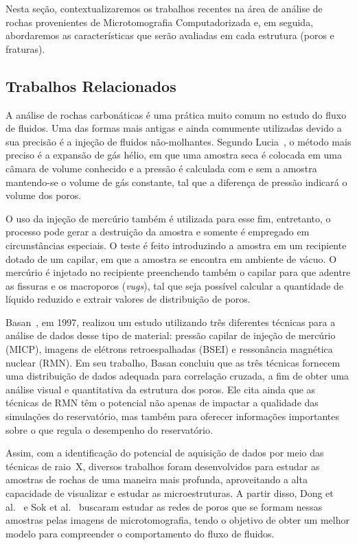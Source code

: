 \documentclass[a4paper,10pt,twocolumn,twoside]{article}
\begin{document}
Nesta seção, contextualizaremos os trabalhos recentes na área de análise de rochas provenientes de Microtomografia Computadorizada e, em seguida, abordaremos as características que serão avaliadas em cada estrutura (poros e fraturas). 

\subsection{Trabalhos Relacionados}


A análise de rochas carbonáticas é uma prática muito comum no estudo do fluxo de fluidos. Uma das formas mais antigas e ainda comumente utilizadas devido a sua precisão é a injeção de fluidos não-molhantes. Segundo Lucia~\cite{lucia2007carbonate}, o método mais preciso é a expansão de gás hélio, em que uma amostra seca é colocada em uma câmara de volume conhecido e a pressão é calculada com e sem a amostra mantendo-se o volume de gás constante, tal que a diferença de pressão indicará o volume dos poros.

O uso da injeção de mercúrio também é utilizada para esse fim, entretanto, o processo pode gerar a destruição da amostra e somente é empregado em circunstâncias especiais. O teste é feito introduzindo a amostra em um recipiente dotado de um capilar, em que a amostra se encontra em ambiente de vácuo. O mercúrio é injetado no recipiente preenchendo também o capilar para que adentre as fissuras e os macroporos (\textit{vugs}), tal que seja possível calcular a quantidade de líquido reduzido e extrair valores de distribuição de poros.

Basan~\cite{basan1997pore}, em 1997, realizou um estudo utilizando três diferentes técnicas para a análise de dados desse tipo de material: pressão capilar de injeção de mercúrio (MICP), imagens de elétrons retroespalhadas (BSEI) e ressonância magnética nuclear (RMN). Em seu trabalho, Basan concluiu que as três técnicas fornecem uma distribuição de dados adequada para correlação cruzada, a fim de obter uma análise visual e quantitativa da estrutura dos poros. Ele cita ainda que as técnicas de RMN têm o potencial não apenas de impactar a qualidade das simulações do reservatório, mas também para oferecer informações importantes sobre o que regula o desempenho do reservatório.

Assim, com a identificação do potencial de aquisição de dados por meio das técnicas de raio~X, diversos trabalhos foram desenvolvidos para estudar as amostras de rochas de uma maneira mais profunda, aproveitando a alta capacidade de visualizar e estudar as microestruturas. A partir disso, Dong et al.~\cite{dong2008pore} e Sok et al.~\cite{sok2010pore} buscaram estudar as redes de poros que se formam nessas amostras pelas imagens de microtomografia, tendo o objetivo de obter um melhor modelo para compreender o comportamento do fluxo de fluidos.
\end{document}
